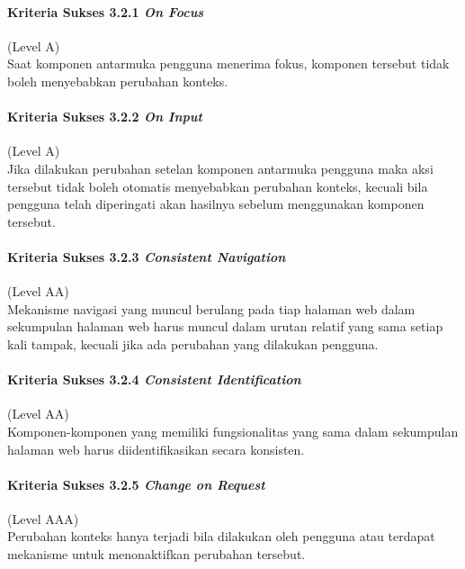 \paragraph{Kriteria Sukses 3.2.1 \textit{On Focus}}
\label{sec:kriteria_sukses_3.2.1}
(Level A)\\

Saat komponen antarmuka pengguna menerima fokus, komponen tersebut tidak boleh menyebabkan perubahan konteks.

\paragraph{Kriteria Sukses 3.2.2 \textit{On Input}}
\label{sec:kriteria_sukses_3.2.2}
(Level A)\\

Jika dilakukan perubahan setelan komponen antarmuka pengguna maka aksi tersebut tidak boleh otomatis menyebabkan perubahan konteks, kecuali bila pengguna telah diperingati akan hasilnya sebelum menggunakan komponen tersebut.

\paragraph{Kriteria Sukses 3.2.3 \textit{Consistent Navigation}}
\label{sec:kriteria_sukses_3.2.3}
(Level AA)\\

Mekanisme navigasi yang muncul berulang pada tiap halaman web dalam sekumpulan halaman web harus muncul dalam urutan relatif yang sama setiap kali tampak, kecuali jika ada perubahan yang dilakukan pengguna.

\paragraph{Kriteria Sukses 3.2.4 \textit{Consistent Identification}}
\label{sec:kriteria_sukses_3.2.4}
(Level AA)\\

Komponen-komponen yang memiliki fungsionalitas yang sama dalam sekumpulan halaman web harus diidentifikasikan secara konsisten.

\paragraph{Kriteria Sukses 3.2.5 \textit{Change on Request}}
\label{sec:kriteria_sukses_3.2.5}
(Level AAA)\\

Perubahan konteks hanya terjadi bila dilakukan oleh pengguna atau terdapat mekanisme untuk menonaktifkan perubahan tersebut.

